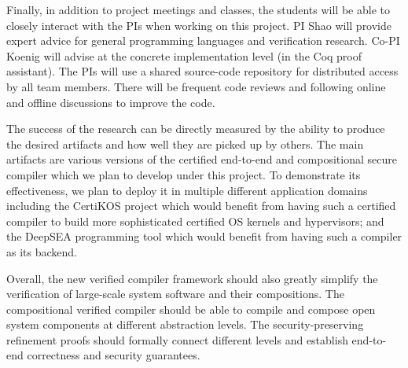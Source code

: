 \documentclass[11pt]{article}
\begin{document}
Finally, in addition to project meetings and classes, the students
will be able to closely interact with the PIs when working on this
project. PI Shao will provide expert advice for general programming
languages and verification research. Co-PI Koenig will advise at the
concrete implementation level (in the Coq proof assistant). The PIs
will use a shared source-code repository for distributed access by all
team members. There will be frequent code reviews and following online
and offline discussions to improve the code.

The success of the research can be directly measured by the ability to
produce the desired artifacts and how well they are picked up by
others. The main artifacts are various versions of the certified
end-to-end and compositional secure compiler which we plan to develop
under this project.  To demonstrate its effectiveness, we plan to
deploy it in multiple different application domains including
the CertiKOS project which would benefit from having such a certified
compiler to build more sophisticated certified OS kernels and hypervisors;
and the DeepSEA programming tool which would benefit from
having such a compiler as its backend. 

Overall, the new verified compiler framework should also greatly
simplify the verification of large-scale system software and their
compositions. The compositional verified compiler should be able to
compile and compose open system components at different abstraction
levels.  The security-preserving refinement proofs should formally
connect different levels and establish end-to-end correctness and
security guarantees.
\end{document}
